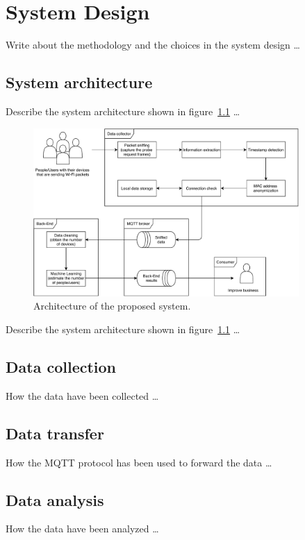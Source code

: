 \chapter{System Design}
\label{cha:system}
\vspace{0.4 cm} 

Write about the methodology and the choices in the system design \dots


\section{System architecture}
\label{sec:sysarc}
\vspace{0.2 cm} 

Describe the system architecture shown in figure~\ref{fig:architecture}  \dots

\begin{figure}[h]
\centering 
\includegraphics[width=0.9\textwidth]{images/architecture} 
\caption{Architecture of the proposed system.}
\label{fig:architecture}
\end{figure}

Describe the system architecture shown in figure~\ref{fig:architecture}  \dots


\section{Data collection}
\label{sec:collection}
\vspace{0.2 cm} 

How the data have been collected \dots


\section{Data transfer}
\label{sec:transfer}
\vspace{0.2 cm} 

How the MQTT protocol has been used to forward the data \dots


\section{Data analysis}
\label{sec:analysis}
\vspace{0.2 cm} 

How the data have been analyzed \dots
